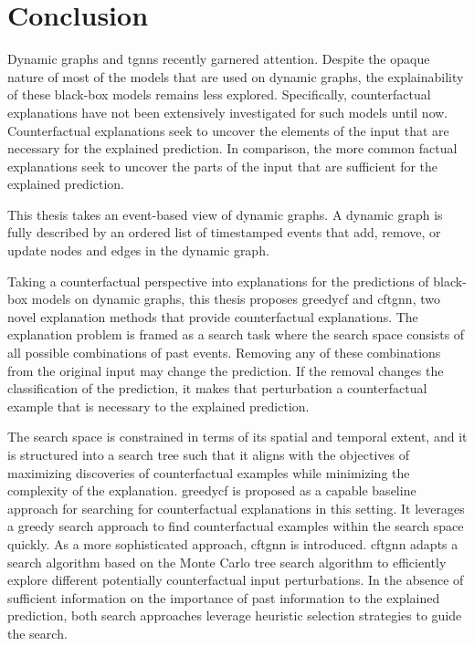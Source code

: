 \section{Conclusion}
\label{s_Conclusion}

Dynamic graphs and \glspl{tgnn} recently garnered attention. Despite the opaque nature of most of the models that are used on dynamic graphs, the explainability of these black-box models remains less explored. Specifically, counterfactual explanations have not been extensively investigated for such models until now. Counterfactual explanations seek to uncover the elements of the input that are necessary for the explained prediction. In comparison, the more common factual explanations seek to uncover the parts of the input that are sufficient for the explained prediction.

This thesis takes an event-based view of dynamic graphs. A dynamic graph is fully described by an ordered list of timestamped events that add, remove, or update nodes and edges in the dynamic graph.

Taking a counterfactual perspective into explanations for the predictions of black-box models on dynamic graphs, this thesis proposes \gls{greedycf} and \gls{cftgnn}, two novel explanation methods that provide counterfactual explanations. The explanation problem is framed as a search task where the search space consists of all possible combinations of past events. Removing any of these combinations from the original input may change the prediction. If the removal changes the classification of the prediction, it makes that perturbation a counterfactual example that is necessary to the explained prediction.

The search space is constrained in terms of its spatial and temporal extent, and it is structured into a search tree such that it aligns with the objectives of maximizing discoveries of counterfactual examples while minimizing the complexity of the explanation. \gls{greedycf} is proposed as a capable baseline approach for searching for counterfactual explanations in this setting. It leverages a greedy search approach to find counterfactual examples within the search space quickly. As a more sophisticated approach, \gls{cftgnn} is introduced. \gls{cftgnn} adapts a search algorithm based on the Monte Carlo tree search algorithm to efficiently explore different potentially counterfactual input perturbations. In the absence of sufficient information on the importance of past information to the explained prediction, both search approaches leverage heuristic selection strategies to guide the search.


